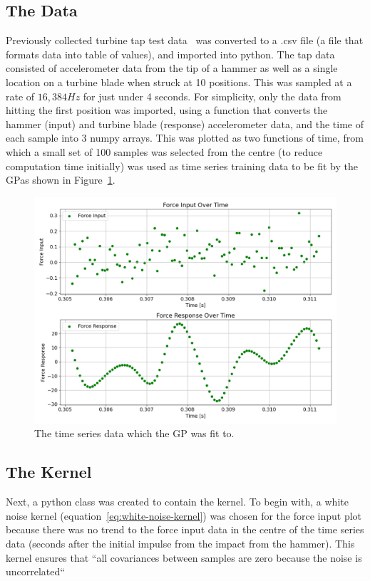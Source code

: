 \documentclass[12pt]{article}
\begin{document}
    \subsection{The Data}
    Previously collected turbine tap test data~\cite{MEC326} was converted to a .csv file (a file that formats data into table of values), and imported into python.
    The tap data consisted of accelerometer data from the tip of a hammer as well as a single location on a turbine blade when struck at 10 positions.
    This was sampled at a rate of $16,384 Hz$ for just under 4 seconds.
    For simplicity, only the data from hitting the first position was imported, using a function that converts the hammer (input) and turbine blade (response) accelerometer data, and the time of each sample into 3 numpy arrays.
    This was plotted as two functions of time, from which a small set of 100 samples was selected from the centre (to reduce computation time initially) was used as time series training data to be fit by the GP\@ as shown in Figure~\ref{fig:input-response-plot}.

    \begin{figure}[ht]
        \centering
        \includegraphics[width=1.0\linewidth]{figures/input-response-plot/input-response-plot.png}
        \caption{The time series data which the GP was fit to.}
        \label{fig:input-response-plot}
    \end{figure}



    \subsection{The Kernel}
    Next, a python class was created to contain the kernel.
    To begin with, a white noise kernel (equation~\ref{eq:white-noise-kernel}) was chosen for the force input plot because there was no trend to the force input data in the centre of the time series data (seconds after the initial impulse from the impact from the hammer).
    This kernel ensures that ``all covariances between samples are zero because the noise is uncorrelated``~\cite{RoelantsGPKernels}
\end{document}
